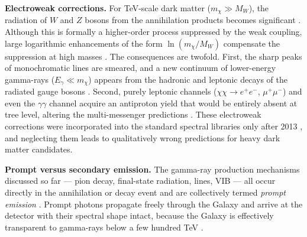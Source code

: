 \textbf{Electroweak corrections.}
For TeV-scale dark matter ($m_\chi \gg M_W$), the radiation of $W$ and $Z$ bosons from the annihilation products becomes significant \cite{Ciafaloni:2010ti,Cirelli:2024ssz}.
Although this is formally a higher-order process suppressed by the weak coupling, large logarithmic enhancements of the form $\ln(m_\chi / M_W)$ compensate the suppression at high masses \cite{Cirelli:2024ssz}.
The consequences are twofold.
First, the sharp peaks of monochromatic lines are smeared, and a new continuum of lower-energy gamma-rays ($E_\gamma \ll m_\chi$) appears from the hadronic and leptonic decays of the radiated gauge bosons \cite{Cirelli:2024ssz}.
Second, purely leptonic channels ($\chi\chi \to e^+e^-$, $\mu^+\mu^-$) and even the $\gamma\gamma$ channel acquire an antiproton yield that would be entirely absent at tree level, altering the multi-messenger predictions \cite{Cirelli:2024ssz}.
These electroweak corrections were incorporated into the standard spectral libraries only after 2013 \cite{Cirelli:2010xx,Cirelli:2024ssz}, and neglecting them leads to qualitatively wrong predictions for heavy dark matter candidates.

\textbf{Prompt versus secondary emission.}
The gamma-ray production mechanisms discussed so far --- pion decay, final-state radiation, lines, VIB --- all occur directly in the annihilation or decay event and are collectively termed \textit{prompt emission} \cite{Cirelli:2024ssz,Pinetti:2021jjs}.
Prompt photons propagate freely through the Galaxy and arrive at the detector with their spectral shape intact, because the Galaxy is effectively transparent to gamma-rays below a few hundred TeV \cite{Hooper:2024}.

